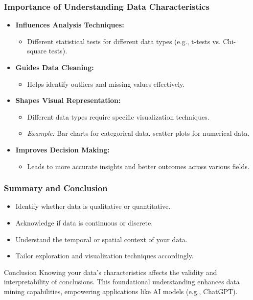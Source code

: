 \documentclass[aspectratio=169]{beamer}
\begin{document}
\begin{frame}[fragile]
    \frametitle{Importance of Understanding Data Characteristics}
    \begin{itemize}
        \item \textbf{Influences Analysis Techniques:}
            \begin{itemize}
                \item Different statistical tests for different data types (e.g., t-tests vs. Chi-square tests).
            \end{itemize}

        \item \textbf{Guides Data Cleaning:}
            \begin{itemize}
                \item Helps identify outliers and missing values effectively.
            \end{itemize}

        \item \textbf{Shapes Visual Representation:}
            \begin{itemize}
                \item Different data types require specific visualization techniques.
                \item \textit{Example:} Bar charts for categorical data, scatter plots for numerical data.
            \end{itemize}

        \item \textbf{Improves Decision Making:}
            \begin{itemize}
                \item Leads to more accurate insights and better outcomes across various fields.
            \end{itemize}
    \end{itemize}
\end{frame}

\begin{frame}[fragile]
    \frametitle{Summary and Conclusion}
    \begin{itemize}
        \item Identify whether data is qualitative or quantitative.
        \item Acknowledge if data is continuous or discrete.
        \item Understand the temporal or spatial context of your data.
        \item Tailor exploration and visualization techniques accordingly.
    \end{itemize}
    
    \begin{block}{Conclusion}
        Knowing your data's characteristics affects the validity and interpretability of conclusions. This foundational understanding enhances data mining capabilities, empowering applications like AI models (e.g., ChatGPT).
    \end{block}
\end{frame}
\end{document}
